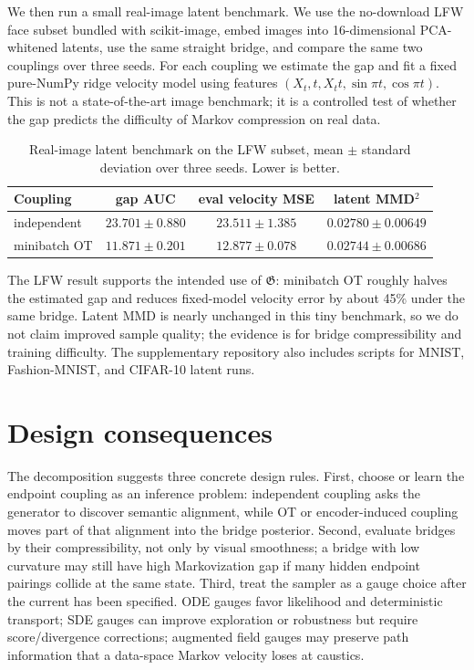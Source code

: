 \documentclass{article}
\numberwithin{equation}{section}
\begin{document}
We then run a small real-image latent benchmark. We use the no-download LFW face subset bundled with scikit-image, embed images into 16-dimensional PCA-whitened latents, use the same straight bridge, and compare the same two couplings over three seeds. For each coupling we estimate the gap and fit a fixed pure-NumPy ridge velocity model using features $(X_t,t,X_t t,\sin \pi t,\cos \pi t)$. This is not a state-of-the-art image benchmark; it is a controlled test of whether the gap predicts the difficulty of Markov compression on real data.

\begin{table}[t]
\centering
\small
\caption{Real-image latent benchmark on the LFW subset, mean $\pm$ standard deviation over three seeds. Lower is better.}
\label{tab:lfw_benchmark}
\begin{tabular}{@{}lccc@{}}
\toprule
Coupling & gap AUC & eval velocity MSE & latent MMD$^2$ \\
\midrule
independent & $23.701\pm0.880$ & $23.511\pm1.385$ & $0.02780\pm0.00649$ \\
minibatch OT & $11.871\pm0.201$ & $12.877\pm0.078$ & $0.02744\pm0.00686$ \\
\bottomrule
\end{tabular}
\end{table}

The LFW result supports the intended use of $\mathfrak G$: minibatch OT roughly halves the estimated gap and reduces fixed-model velocity error by about 45\% under the same bridge. Latent MMD is nearly unchanged in this tiny benchmark, so we do not claim improved sample quality; the evidence is for bridge compressibility and training difficulty. The supplementary repository also includes scripts for MNIST, Fashion-MNIST, and CIFAR-10 latent runs.

\section{Design consequences}
\label{sec:design}

The decomposition suggests three concrete design rules. First, choose or learn the endpoint coupling as an inference problem: independent coupling asks the generator to discover semantic alignment, while OT or encoder-induced coupling moves part of that alignment into the bridge posterior. Second, evaluate bridges by their compressibility, not only by visual smoothness; a bridge with low curvature may still have high Markovization gap if many hidden endpoint pairings collide at the same state. Third, treat the sampler as a gauge choice after the current has been specified. ODE gauges favor likelihood and deterministic transport; SDE gauges can improve exploration or robustness but require score/divergence corrections; augmented field gauges may preserve path information that a data-space Markov velocity loses at caustics.
\end{document}
